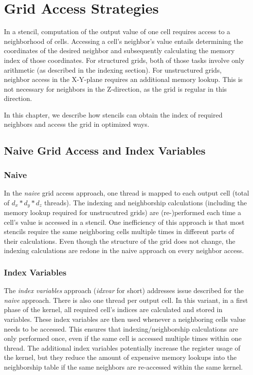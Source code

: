 \chapter{Grid Access Strategies} \label{sec:optimizations}

In a stencil, computation of the output value of one cell requires access to a neighborhood of cells. Accessing a cell's neighbor's value entails determining the coordinates of the desired neighbor and subsequently calculating the memory index of those coordinates. For structured grids, both of those tasks involve only arithmetic (as described in the indexing section). For unstructured grids, neighbor access in the X-Y-plane requires an additional memory lookup. This is not necessary for neighbors in the Z-direction, as the grid is regular in this direction.

In this chapter, we describe how stencils can obtain the index of required neighbors and access the grid in optimized ways.

\section{Naive Grid Access and Index Variables}

\subsection{Naive} In the \emph{naive} grid access approach, one thread is mapped to each output cell (total of $d_x*d_y*d_z$ threads). The indexing and neighborship calculations (including the memory lookup required for unstrucutred grids) are (re-)performed each time a cell's value is accessed in a stencil.  One inefficiency of this approach is that most stencils require the same neighboring cells multiple times in different parts of their calculations. Even though the structure of the grid does not change, the indexing calculations are redone in the naive approach on every neighbor access.

\subsection{Index Variables} The \emph{index variables} approach (\emph{idxvar} for short) addresses issue described for the \emph{naive} approach. There is also one thread per output cell. In this variant, in a first phase of the kernel, all required cell's indices are calculated and stored in variables. These index variables are then used whenever a neighboring cells value needs to be accessed. This ensures that indexing/neighborship calculations are only performed once, even if the same cell is accessed multiple times within one thread. The additional index variables potentially increase the register usage of the kernel, but they reduce the amount of expensive memory lookups into the neighborship table if the same neighbors are re-accessed within the same kernel.

